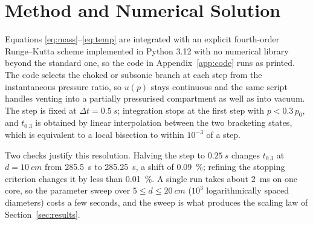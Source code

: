 \section{Method and Numerical Solution}
\label{sec:method}

Equations \eqref{eq:mass}--\eqref{eq:temp} are integrated with an explicit
fourth-order Runge--Kutta scheme implemented in Python 3.12 with no
numerical library beyond the standard one, so the code in
Appendix~\ref{app:code} runs as printed. The code selects the choked or subsonic
branch at each step from the instantaneous pressure ratio, so $u(p)$ stays
continuous and the same script handles venting into a partially pressurised
compartment as well as into vacuum. The step is fixed at $\Delta t=\SI{0.5}{s}$; integration stops at the
first step with $p<0.3\,p_0$, and $t_{0.3}$ is obtained by linear
interpolation between the two bracketing states, which is equivalent to a
local bisection to within $10^{-3}$ of a step.

Two checks justify this resolution. Halving the step to
$\SI{0.25}{s}$ changes $t_{0.3}$ at $d=\SI{10}{cm}$ from \SI{285.5}{s} to
\SI{285.25}{s}, a shift of \SI{0.09}{\percent}; refining the stopping
criterion changes it by less than \SI{0.01}{\percent}. A single run takes
about \SI{2}{ms} on one core, so the parameter sweep over
$5\le d\le\SI{20}{cm}$ ($10^{3}$ logarithmically spaced diameters) costs
a few seconds, and the sweep is what produces the scaling law of
Section~\ref{sec:results}.

